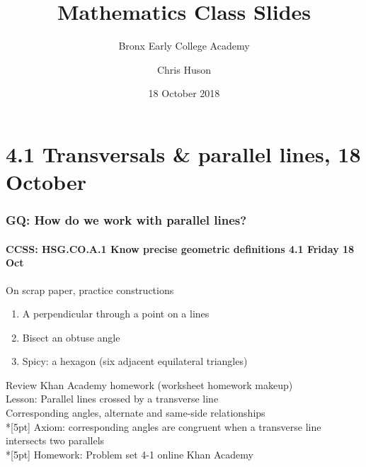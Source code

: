 \documentclass{beamer}
\title{Mathematics Class Slides}
\subtitle{Bronx Early College Academy}
\author{Chris Huson}
\date{18 October 2018}
\begin{document}
\frame{\titlepage}
\section[Outline]{}
\frame{\tableofcontents}


\section{4.1 Transversals \& parallel lines, 18 October}
  \frame
  {
    \frametitle{GQ: How do we work with parallel lines?}
    \framesubtitle{CCSS: HSG.CO.A.1 Know precise geometric definitions \hfill \alert{4.1 Friday 18 Oct}}

    \begin{block}{On scrap paper, practice constructions}
    \begin{enumerate}
      \item A perpendicular through a point on a lines
      \item Bisect an obtuse angle
      \item Spicy: a hexagon (six adjacent equilateral triangles)
    \end{enumerate}
    \end{block}
    Review Khan Academy homework (worksheet homework makeup)\\
    Lesson: Parallel lines crossed by a transverse line \\
    Corresponding angles, alternate and same-side relationships \\*[5pt]
    Axiom: corresponding angles are congruent when a transverse line intersects two parallels\\*[5pt]
    Homework: Problem set 4-1 online Khan Academy
  }
\end{document}
